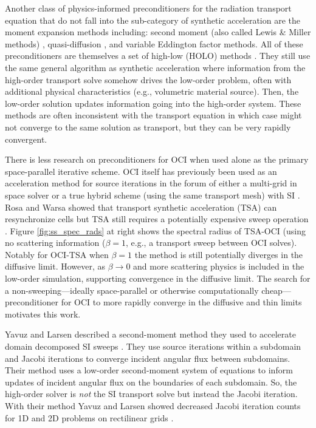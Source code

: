 Another class of physics-informed preconditioners for the radiation transport equation that do not fall into the sub-category of synthetic acceleration are the moment expansion methods including: second moment (also called Lewis \& Miller methods) \cite{olivier_2024_smoms, lewis_computational_1984, oliver_2025_secondmoment}, quasi-diffusion \cite{ani_1986_quasidiffusion, goldin_1964_quasidissuion}, and variable Eddington factor \cite{lou_2021_vef, coale_2024_rmomvef} methods.
All of these preconditioners are themselves a set of high-low (HOLO) methods \cite{chacon_2017_holosurvey}.
They still use the same general algorithm as synthetic acceleration where information from the high-order transport solve somehow drives the low-order problem, often with additional physical characteristics (e.g., volumetric material source).
Then, the low-order solution updates information going into the high-order system.
These methods are often inconsistent with the transport equation in which case might not converge to the same solution as transport, but they can be very rapidly convergent.

There is less research on preconditioners for OCI when used alone as the primary space-parallel iterative scheme.
OCI itself has previously been used as an acceleration method for source iterations in the forum of either a multi-grid in space solver \cite{kang2000oci, man1994parallel} or a true hybrid scheme (using the same transport mesh) with SI \cite{hoagland_hybrid_2021}.
Rosa and Warsa showed that transport synthetic acceleration (TSA) can resynchronize cells but TSA still requires a potentially expensive sweep operation \cite{tsa2009rosa}.
Figure \ref{fig:ss_spec_rads} at right shows the spectral radius of TSA-OCI (using no scattering information ($\beta=1$, e.g., a transport sweep between OCI solves).
Notably for OCI-TSA when $\beta=1$ the method is still potentially diverges in the diffusive limit.
However, as $\beta\rightarrow0$ and more scattering physics is included in the low-order simulation, supporting convergence in the diffusive limit.
The search for a non-sweeping---ideally space-parallel or otherwise computationally cheap---preconditioner for OCI to more rapidly converge in the diffusive and thin limits motivates this work.

Yavuz and Larsen described a second-moment method they used to accelerate domain decomposed SI sweeps \cite{yavuz_spatial_1989}.
They use source iterations within a subdomain and Jacobi iterations to converge incident angular flux between subdomains.
Their method uses a low-order second-moment system of equations to inform updates of incident angular flux on the boundaries of each subdomain.
So, the high-order solver is \emph{not} the SI transport solve but instead the Jacobi iteration.
With their method Yavuz and Larsen showed decreased Jacobi iteration counts for 1D and 2D problems on rectilinear grids \cite{yavuz_spatial_1989, yavuz_1992_2ddd}.

